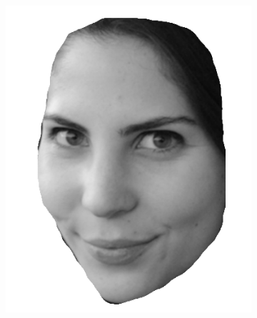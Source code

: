 \begin{figure}
    \centering
    \begin{subfigure}{0.23\textwidth}
        \centering
        \includegraphics[width=\textwidth]{statistical_normals/images/sirfs_borrowed/sirfs_input1}
\label{subfig:sirfs-1-input}
    \end{subfigure}
    \begin{subfigure}{0.23\textwidth}
        \centering

\end{subfigure}
\end{figure}
